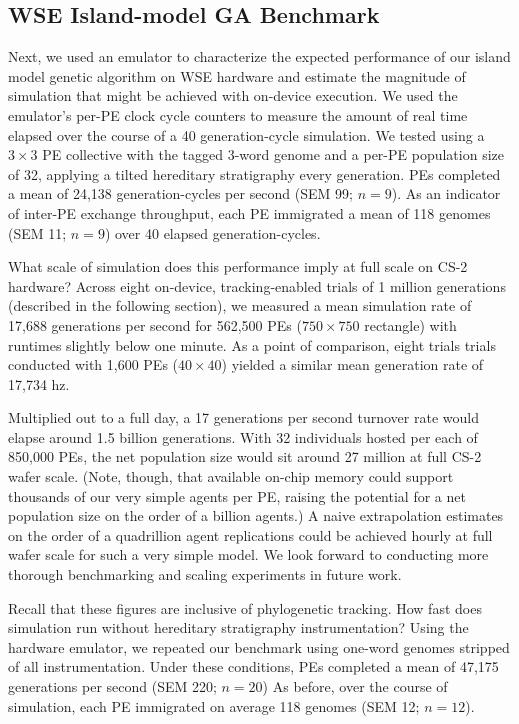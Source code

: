 \subsection{WSE Island-model GA Benchmark}

Next, we used an emulator to characterize the expected performance of our island model genetic algorithm on WSE hardware and estimate the magnitude of simulation that might be achieved with on-device execution.
We used the emulator's per-PE clock cycle counters to measure the amount of real time elapsed over the course of a 40 generation-cycle simulation.
We tested using a $3\times3$ PE collective with the tagged 3-word genome and a per-PE population size of 32, applying a tilted hereditary stratigraphy every generation.
PEs completed a mean of 24,138 generation-cycles per second (SEM 99; $n=9$).
As an indicator of inter-PE exchange throughput, each PE immigrated a mean of 118 genomes (SEM 11; $n=9$) over 40 elapsed generation-cycles.

What scale of simulation does this performance imply at full scale on CS-2 hardware?
Across eight on-device, tracking-enabled trials of 1 million generations (described in the following section), we measured a mean simulation rate of 17,688 generations per second for 562,500 PEs ($750\times750$ rectangle) with runtimes slightly below one minute.
As a point of comparison, eight trials trials conducted with 1,600 PEs ($40\times40$) yielded a similar mean generation rate of 17,734 hz.

Multiplied out to a full day, a 17 generations per second turnover rate would elapse around 1.5 billion generations.
With 32 individuals hosted per each of 850,000 PEs, the net population size would sit around 27 million at full CS-2 wafer scale.
(Note, though, that available on-chip memory could support thousands of our very simple agents per PE, raising the potential for a net population size on the order of a billion agents.)
A naive extrapolation estimates on the order of a quadrillion agent replications could be achieved hourly at full wafer scale for such a very simple model.
We look forward to conducting more thorough benchmarking and scaling experiments in future work.

Recall that these figures are inclusive of phylogenetic tracking.
How fast does simulation run without hereditary stratigraphy instrumentation?
Using the hardware emulator, we repeated our benchmark using one-word genomes stripped of all instrumentation.
Under these conditions, PEs completed a mean of 47,175 generations per second (SEM 220; $n=20$)
As before, over the course of simulation, each PE immigrated on average 118 genomes (SEM 12; $n=12$).


